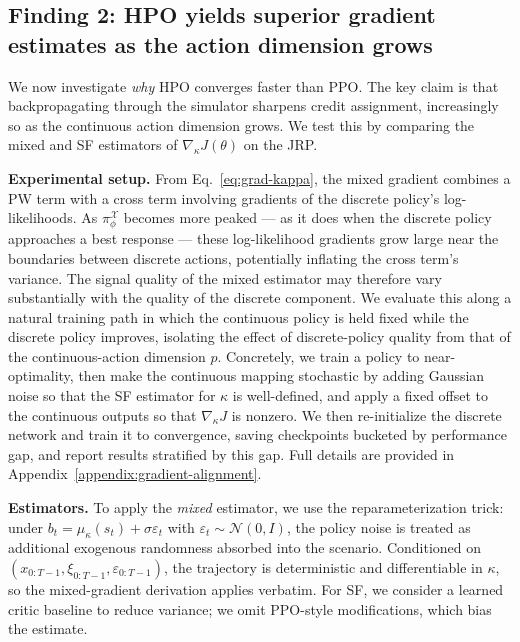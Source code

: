 \documentclass{article}
\theoremstyle{definition}
\theoremstyle{remark}
\begin{document}
\subsection{Finding 2: HPO yields superior gradient estimates as the action dimension grows}
\label{sec:gradient-quality-exps}
 
We now investigate \emph{why} HPO converges faster than PPO. The key claim is that 
backpropagating through the simulator sharpens credit assignment, increasingly so as 
the continuous action dimension grows. We test this by comparing the mixed and SF 
estimators of $\nabla_\kappa J(\theta)$ on the JRP.
 
{\bf Experimental setup.}
From Eq.~\eqref{eq:grad-kappa}, the mixed gradient combines a PW term with a cross term involving gradients of the discrete policy's log-likelihoods. As $\pi^{\mathcal{X}}_\phi$ becomes more peaked --- as it does when the discrete policy approaches a best response --- these log-likelihood gradients grow large near the boundaries between discrete actions, potentially inflating the cross term's variance. The signal quality of the mixed estimator may therefore vary substantially with the quality of the discrete component. We evaluate this along a natural training path in which the continuous policy is held fixed while the discrete policy improves, isolating the effect of discrete-policy quality from that of the continuous-action dimension $p$. Concretely, we train a policy to near-optimality, then make the continuous mapping stochastic by adding Gaussian noise so that the SF estimator for $\kappa$ is well-defined, and apply a fixed offset to the continuous outputs so that $\nabla_\kappa J$ is nonzero. We then re-initialize the discrete network and train it to convergence, saving checkpoints bucketed by performance gap, and report results stratified by this gap. Full details are provided in Appendix~\ref{appendix:gradient-alignment}.
 
{\bf Estimators.}
To apply the \emph{mixed} estimator, we use the reparameterization trick: under
$b_t = \mu_\kappa(s_t) + \sigma \varepsilon_t$ with $\varepsilon_t \sim \mathcal{N}(0, I)$,
the policy noise is treated as additional exogenous randomness absorbed into the scenario.
Conditioned on $(x_{0:T-1}, \xi_{0:T-1}, \varepsilon_{0:T-1})$, the trajectory is deterministic and
differentiable in $\kappa$, so the mixed-gradient derivation applies verbatim. For SF,
we consider a learned critic baseline to reduce variance; we omit PPO-style modifications, which bias the estimate.
 
\end{document}

